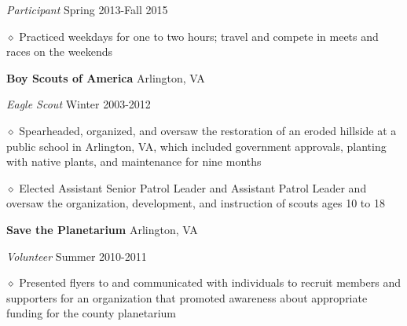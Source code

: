 \documentclass[executivepaper]{extarticle}
\begin{document}
\begin{center}
{\begin{minipage}{7.0in}
{\noindent \textit{\fontsize{12}{8}\selectfont Participant}} {\hfill \fontsize{10}{8}\selectfont Spring 2013-Fall 2015}

\vspace{0.25mm}

{\noindent $\diamond$ {\fontsize{12}{8}\selectfont Practiced weekdays for one to two hours; travel and compete in meets and races on the weekends}}

\vspace{2mm}

{\noindent \textbf{\fontsize{12}{8}\selectfont Boy Scouts of America}} {\hfill \fontsize{10}{8}\selectfont Arlington, VA}

\vspace{0.25mm}

{\noindent \textit{\fontsize{12}{8}\selectfont Eagle Scout}} {\hfill \fontsize{10}{8}\selectfont Winter 2003-2012}

\vspace{0.25mm}

{\noindent $\diamond$ {\fontsize{12}{8}\selectfont Spearheaded, organized, and oversaw the restoration of an eroded hillside at a public school in Arlington, VA, which included government
approvals, planting with native plants, and maintenance for nine months}}

{\noindent $\diamond$ {\fontsize{12}{8}\selectfont Elected Assistant Senior Patrol Leader and Assistant Patrol Leader and oversaw the organization, development, and instruction of scouts ages 10 to 18}}

\vspace{2mm}

{\noindent \textbf{\fontsize{12}{8}\selectfont Save the Planetarium}} {\hfill \fontsize{10}{8}\selectfont Arlington, VA}

\vspace{0.25mm}

{\noindent \textit{\fontsize{12}{8}\selectfont Volunteer}} {\hfill \fontsize{10}{8}\selectfont Summer 2010-2011}

\vspace{0.25mm}

{\noindent $\diamond$ {\fontsize{12}{8}\selectfont Presented flyers to and communicated with individuals to recruit members and supporters for an organization that promoted awareness about appropriate funding
for the county planetarium}}

\vspace{3mm}



\end{minipage}}
\end{center}
\end{document}
